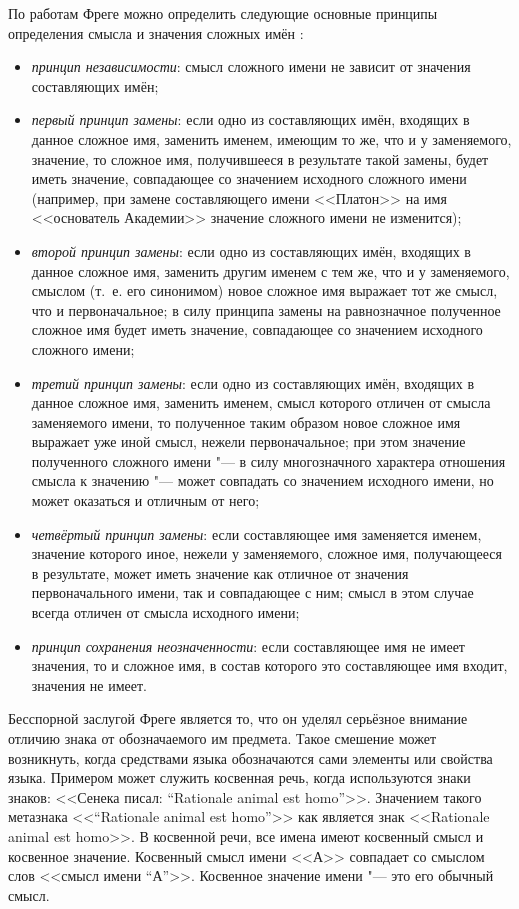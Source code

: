 \documentclass[a4paper,12pt]{article}
\begin{document}
	По работам Фреге можно определить следующие основные принципы определения смысла и значения сложных имён \cite{Birukov1960}:
	\begin{itemize}
		\item \textit{принцип независимости}: смысл сложного имени не зависит от значения составляющих имён;
		\item \textit{первый принцип замены}: если одно из составляющих имён, входящих в данное сложное имя, заменить именем, имеющим то же, что и у заменяемого, значение, то сложное имя, получившееся в результате такой замены, будет иметь значение, совпадающее со значением исходного сложного имени (например, при замене составляющего имени <<Платон>> на имя <<основатель Академии>> значение сложного имени не изменится);
		\item \textit{второй принцип замены}: если одно из составляющих имён, входящих в данное сложное имя, заменить другим именем с тем же, что и у заменяемого, смыслом (т.~е. его синонимом) новое сложное имя выражает тот же смысл, что и первоначальное; в силу принципа замены на равнозначное полученное сложное имя будет иметь значение, совпадающее со значением исходного сложного имени;
		\item \textit{третий принцип замены}: если одно из составляющих имён, входящих в данное сложное имя, заменить именем, смысл которого отличен от смысла заменяемого имени, то полученное таким образом новое сложное имя выражает уже иной смысл, нежели первоначальное; при этом значение полученного сложного имени "--- в силу многозначного характера отношения смысла к значению "--- может совпадать со значением исходного имени, но может оказаться и отличным от него;
		\item \textit{четвёртый принцип замены}: если составляющее имя заменяется именем, значение которого иное, нежели у заменяемого, сложное имя, получающееся в результате, может иметь значение как отличное от значения первоначального имени, так и совпадающее с ним; смысл в этом случае всегда отличен от смысла исходного имени;
		\item \textit{принцип сохранения неозначенности}: если составляющее имя не имеет значения, то и сложное имя, в состав которого это составляющее имя входит, значения не имеет.
	\end{itemize}
	
	Бесспорной заслугой Фреге является то, что он уделял серьёзное внимание отличию знака от обозначаемого им предмета. Такое смешение может возникнуть, когда средствами языка обозначаются сами элементы или свойства языка. Примером может служить косвенная речь, когда используются знаки знаков: <<Сенека писал: ``Rationale animal est homo''>>. Значением такого метазнака <<``Rationale animal est homo''>> как является знак <<Rationale animal est homo>>. В косвенной речи, все имена имеют косвенный смысл и косвенное значение. Косвенный смысл имени <<А>> совпадает со смыслом слов <<смысл имени ``А''>>. Косвенное значение имени "--- это его обычный смысл.
	
\end{document}
